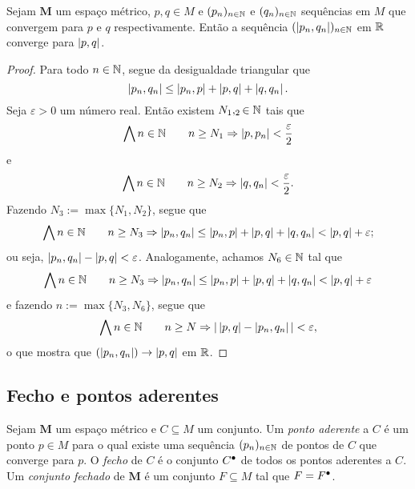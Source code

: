 \begin{proposition}
Sejam $\bm M$ um espaço métrico, $p,q \in M$ e $(p_n)_{n \in \mathbb{N}}$ e $(q_n)_{n \in \mathbb{N}}$ sequências em $M$ que convergem para $p$ e $q$ respectivamente. Então a sequência $(\left\vert{p_n},{q_n}\right\vert)_{n \in \mathbb{N}}$ em $\mathbb{R}$ converge para $\left\vert{p},{q}\right\vert$.
\end{proposition}
\begin{proof}
	Para todo $n \in \mathbb{N}$, segue da desigualdade triangular que
	\begin{equation*}
	\left\vert{p_n},{q_n}\right\vert \leq \left\vert{p_n},{p}\right\vert + \left\vert{p},{q}\right\vert + \left\vert{q},{q_n}\right\vert.
	\end{equation*}
Seja $\varepsilon > 0$ um número real. Então existem $N_1,_2 \in \mathbb{N}$ tais que
	\begin{equation*}
	\bigwedge\nolimits n \in \mathbb{N} \qquad n \geq N_1 \Rightarrow \left\vert{p},{p_n}\right\vert < \frac{\varepsilon}{2}
	\end{equation*}
e
	\begin{equation*}
	\bigwedge\nolimits n \in \mathbb{N} \qquad n \geq N_2 \Rightarrow \left\vert{q},{q_n}\right\vert < \frac{\varepsilon}{2}.
	\end{equation*}
Fazendo $N_3 := \max\{N_1,N_2\}$, segue que
	\begin{equation*}
	\bigwedge\nolimits n \in \mathbb{N} \qquad n \geq N_3 \Rightarrow \left\vert{p_n},{q_n}\right\vert \leq \left\vert{p_n},{p}\right\vert + \left\vert{p},{q}\right\vert + \left\vert{q},{q_n}\right\vert < \left\vert{p},{q}\right\vert + \varepsilon;
	\end{equation*}
ou seja, $\left\vert{p_n},{q_n}\right\vert - \left\vert{p},{q}\right\vert < \varepsilon$. Analogamente, achamos $N_6 \in \mathbb{N}$ tal que
	\begin{equation*}
	\bigwedge\nolimits n \in \mathbb{N} \qquad n \geq N_3 \Rightarrow \left\vert{p_n},{q_n}\right\vert \leq \left\vert{p_n},{p}\right\vert + \left\vert{p},{q}\right\vert + \left\vert{q},{q_n}\right\vert < \left\vert{p},{q}\right\vert + \varepsilon
	\end{equation*}
e fazendo $n := \max\{N_3,N_6\}$, segue que
	\begin{equation*}
	\bigwedge\nolimits n \in \mathbb{N} \qquad n \geq N \Rightarrow |\left\vert{p},{q}\right\vert - \left\vert{p_n},{q_n}\right\vert| < \varepsilon,
	\end{equation*}
o que mostra que $(\left\vert{p_n},{q_n}\right\vert) \rightarrow \left\vert{p},{q}\right\vert$ em $\mathbb{R}$.
	
\end{proof}

\subsection{Fecho e pontos aderentes}

\begin{definition}
Sejam $\bm M$ um espaço métrico e $C \subseteq M$ um conjunto. Um \emph{ponto aderente} a $C$ é um ponto $p \in M$ para o qual existe uma sequência $(p_n)_{n \in \mathbb{N}}$ de pontos de $C$ que converge para $p$. O \emph{fecho} de $C$ é o conjunto ${C}^\bullet$ de todos os pontos aderentes a $C$. Um \emph{conjunto fechado} de $\bm M$ é um conjunto $F \subseteq M$ tal que $F = {F}^\bullet$.
\end{definition}

